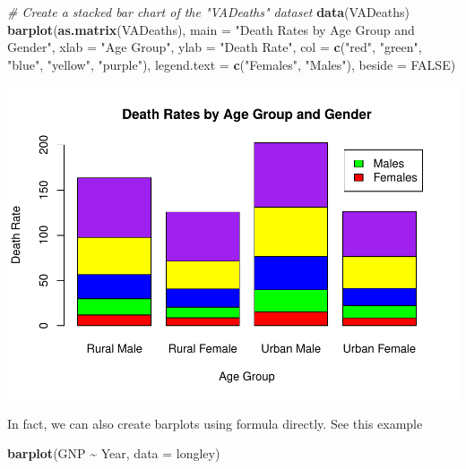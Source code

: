 \documentclass[
]{book}
\newenvironment{Shaded}{\begin{snugshade}}{\end{snugshade}}
\newcommand{\AttributeTok}[1]{\textcolor[rgb]{0.13,0.29,0.53}{#1}}
\newcommand{\CommentTok}[1]{\textcolor[rgb]{0.56,0.35,0.01}{\textit{#1}}}
\newcommand{\ConstantTok}[1]{\textcolor[rgb]{0.56,0.35,0.01}{#1}}
\newcommand{\FunctionTok}[1]{\textcolor[rgb]{0.13,0.29,0.53}{\textbf{#1}}}
\newcommand{\NormalTok}[1]{#1}
\newcommand{\SpecialCharTok}[1]{\textcolor[rgb]{0.81,0.36,0.00}{\textbf{#1}}}
\newcommand{\StringTok}[1]{\textcolor[rgb]{0.31,0.60,0.02}{#1}}
\begin{document}
\begin{Shaded}
\begin{Highlighting}[]
\CommentTok{\# Create a stacked bar chart of the "VADeaths" dataset}
\FunctionTok{data}\NormalTok{(VADeaths)}
\FunctionTok{barplot}\NormalTok{(}\FunctionTok{as.matrix}\NormalTok{(VADeaths), }
        \AttributeTok{main =} \StringTok{"Death Rates by Age Group and Gender"}\NormalTok{, }
        \AttributeTok{xlab =} \StringTok{"Age Group"}\NormalTok{, }
        \AttributeTok{ylab =} \StringTok{"Death Rate"}\NormalTok{, }
        \AttributeTok{col =} \FunctionTok{c}\NormalTok{(}\StringTok{"red"}\NormalTok{, }\StringTok{"green"}\NormalTok{, }\StringTok{"blue"}\NormalTok{, }\StringTok{"yellow"}\NormalTok{, }\StringTok{"purple"}\NormalTok{), }
        \AttributeTok{legend.text =} \FunctionTok{c}\NormalTok{(}\StringTok{"Females"}\NormalTok{, }\StringTok{"Males"}\NormalTok{), }
        \AttributeTok{beside =} \ConstantTok{FALSE}\NormalTok{)}
\end{Highlighting}
\end{Shaded}

\begin{center}\includegraphics[height=0.55\textheight]{DauR_files/figure-latex/p9-1} \end{center}

In fact, we can also create barplots using formula directly. See this example

\begin{Shaded}
\begin{Highlighting}[]
\FunctionTok{barplot}\NormalTok{(GNP }\SpecialCharTok{\textasciitilde{}}\NormalTok{ Year, }\AttributeTok{data =}\NormalTok{ longley)}
\end{Highlighting}
\end{Shaded}
\end{document}
